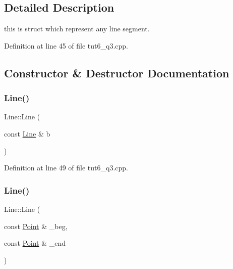 \subsection{Detailed Description}
this is struct which represent any line segment. 

Definition at line 45 of file tut6\+\_\+q3.\+cpp.



\subsection{Constructor \& Destructor Documentation}
\mbox{\label{struct_line_a549d53aa564e20ba316c241f4938254b}} 
\subsubsection{\texorpdfstring{Line()}{Line()}\hspace{0.1cm}{\footnotesize\ttfamily [1/2]}}
{\footnotesize\ttfamily Line\+::\+Line (\begin{DoxyParamCaption}\item[{const \hyperlink{struct_line}{Line} \&}]{b }\end{DoxyParamCaption})\hspace{0.3cm}{\ttfamily [inline]}}



Definition at line 49 of file tut6\+\_\+q3.\+cpp.

\mbox{\label{struct_line_acd6e6638a77890435f82abb1e666dd25}} 
\subsubsection{\texorpdfstring{Line()}{Line()}\hspace{0.1cm}{\footnotesize\ttfamily [2/2]}}
{\footnotesize\ttfamily Line\+::\+Line (\begin{DoxyParamCaption}\item[{const \hyperlink{struct_point}{Point} \&}]{\+\_\+beg,  }\item[{const \hyperlink{struct_point}{Point} \&}]{\+\_\+end }\end{DoxyParamCaption})\hspace{0.3cm}{\ttfamily [inline]}}



